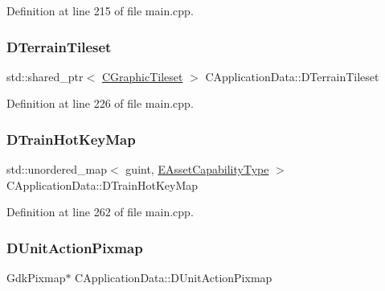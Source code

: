Definition at line 215 of file main.\+cpp.

\hypertarget{classCApplicationData_acd9fb0d0ea35a6d93e8ec9212db8ef83}{}\label{classCApplicationData_acd9fb0d0ea35a6d93e8ec9212db8ef83} 
\subsubsection{\texorpdfstring{D\+Terrain\+Tileset}{DTerrainTileset}}
{\footnotesize\ttfamily std\+::shared\+\_\+ptr$<$ \hyperlink{classCGraphicTileset}{C\+Graphic\+Tileset} $>$ C\+Application\+Data\+::\+D\+Terrain\+Tileset\hspace{0.3cm}{\ttfamily [protected]}}



Definition at line 226 of file main.\+cpp.

\hypertarget{classCApplicationData_a35798136764b6d2ede555494752e83eb}{}\label{classCApplicationData_a35798136764b6d2ede555494752e83eb} 
\subsubsection{\texorpdfstring{D\+Train\+Hot\+Key\+Map}{DTrainHotKeyMap}}
{\footnotesize\ttfamily std\+::unordered\+\_\+map$<$ guint, \hyperlink{GameDataTypes_8h_a35b98ce26aca678b03c6f9f76e4778ce}{E\+Asset\+Capability\+Type} $>$ C\+Application\+Data\+::\+D\+Train\+Hot\+Key\+Map\hspace{0.3cm}{\ttfamily [protected]}}



Definition at line 262 of file main.\+cpp.

\hypertarget{classCApplicationData_ae264356c833cd581093e3b373cce6620}{}\label{classCApplicationData_ae264356c833cd581093e3b373cce6620} 
\subsubsection{\texorpdfstring{D\+Unit\+Action\+Pixmap}{DUnitActionPixmap}}
{\footnotesize\ttfamily Gdk\+Pixmap$\ast$ C\+Application\+Data\+::\+D\+Unit\+Action\+Pixmap\hspace{0.3cm}{\ttfamily [protected]}}



